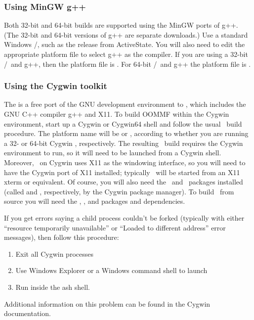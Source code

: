 \subsubsection{Using MinGW g++}

Both 32-bit and 64-bit builds are supported using the MinGW ports of
g++.  (The 32-bit and 64-bit versions of g++ are separate downloads.)
Use a standard Windows \Tcl/\Tk, such as the
release from ActiveState.  You will also need to edit the appropriate
platform file to select g++ as the compiler.  If you are using a 32-bit
\Tcl/\Tk\ and g++, then the platform file is
.  For 64-bit
\Tcl/\Tk\ and g++ the platform file is
.

\subsubsection{Using the Cygwin toolkit}\label{par:install.cygwin}
The  is
a free port of the GNU development environment to \Windows, which
includes the GNU C++ compiler g++ and X11.  To build OOMMF within the
Cygwin environment, start up a Cygwin or Cygwin64 shell and follow the
usual \Unix\ build procedure.  The platform name will be 
or , according to whether you are running a 32- or
64-bit Cygwin , respectively.  The resulting \OOMMF\ build
requires the Cygwin environment to run, so it will need to be launched
from a Cygwin shell.  Moreover, \OOMMF\ on Cygwin uses X11 as the
windowing interface, so you will need to have the Cygwin port of X11
installed; typically \OOMMF\ will be started from an X11 xterm or
equivalent.  Of course, you will also need the \Tcl\ and \Tk\ packages
installed (called  and , respectively, by the
Cygwin package manager).  To build \OOMMF\ from source you will
need the , , and 
packages and dependencies.

If you get errors saying a child process couldn't be forked (typically
with either ``resource temporarily unavailable'' or ``Loaded to
different address'' error messages), then follow this procedure:
\begin{enumerate}
\item Exit all Cygwin processes
\item Use Windows Explorer or a Windows command shell to launch
\item Run  inside the ash shell.
\end{enumerate}
Additional information on this problem can be found in the Cygwin
documentation.

